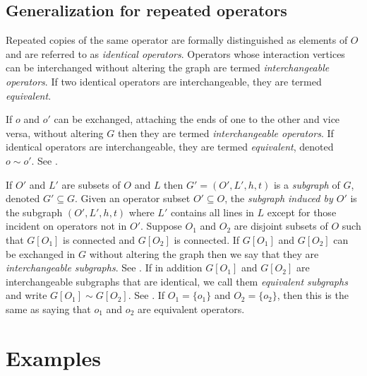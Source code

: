 \documentclass[11pt,fleqn]{article}
\numberwithin{equation}{section}
\begin{document}
\subsection{Generalization for repeated operators}\label{subsec:repeated-operators}

\begin{dfn}
Repeated copies of the same operator are formally distinguished as elements of $O$ and are referred to as \textit{identical operators}.
Operators whose interaction vertices can be interchanged without altering the graph are termed \textit{interchangeable operators}.
If two identical operators are interchangeable, they are termed \textit{equivalent}.
\end{dfn}

\begin{dfn}
If $o$ and $o'$ can be exchanged, attaching the ends of one to the other and vice versa, without altering $G$ then they are termed \textit{interchangeable operators}.
If identical operators are interchangeable, they are termed \textit{equivalent}, denoted $o\sim o'$.
See .
\end{dfn}

\begin{dfn}
If $O'$ and $L'$ are subsets of $O$ and $L$ then $G'=(O',L',h,t)$ is a \textit{subgraph} of $G$, denoted $G'\subseteq G$.
Given an operator subset $O'\subseteq O$, the \textit{subgraph induced by $O'$} is the subgraph $(O',L',h,t)$ where $L'$ contains all lines in $L$ except for those incident on operators not in $O'$.
Suppose $O_1$ and $O_2$ are disjoint subsets of $O$ such that $G[O_1]$ is connected and $G[O_2]$ is connected.
If $G[O_1]$ and $G[O_2]$ can be exchanged in $G$ without altering the graph then we say that they are \textit{interchangeable subgraphs}.
See .
If in addition $G[O_1]$ and $G[O_2]$ are interchangeable subgraphs that are identical, we call them \textit{equivalent subgraphs} and write $G[O_1]\sim G[O_2]$.
See .
If $O_1=\{o_1\}$ and $O_2=\{o_2\}$, then this is the same as saying that $o_1$ and $o_2$ are equivalent operators.
\end{dfn}


\newpage
\appendix

\section{Examples}
\end{document}
